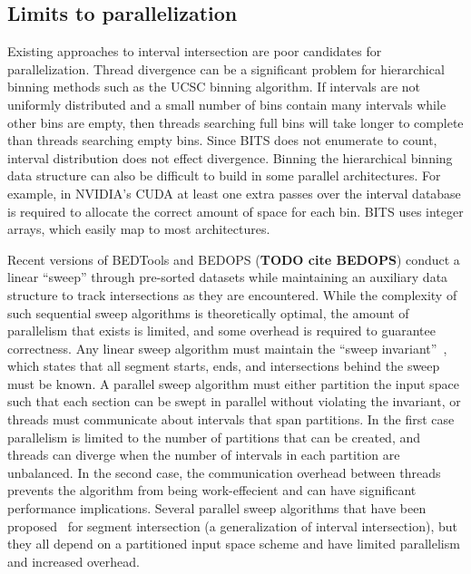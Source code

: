 \documentclass{bioinfo}
\begin{document}
	\subsection{Limits to parallelization}

	Existing approaches to interval intersection are poor candidates for
	parallelization.  Thread divergence can be a significant problem for
	hierarchical binning methods such as the UCSC binning algorithm.  If intervals
	are not uniformly distributed and a small number of bins contain many intervals
	while other bins are empty, then threads searching full bins will take longer to
	complete than threads searching empty bins.  Since BITS does not enumerate to
	count, interval distribution does not effect divergence.  Binning the 
	hierarchical binning data structure can also be difficult to build in some
	parallel architectures.  For example, in NVIDIA's CUDA at least one extra passes
	over the interval database is required to allocate the correct amount of space 
	for each bin.  BITS uses integer arrays, which easily map to most architectures.

	Recent versions of BEDTools and BEDOPS (\textbf{TODO cite BEDOPS}) conduct a
	linear ``sweep'' through pre-sorted datasets while maintaining an auxiliary
	data structure to track intersections as they are encountered. While the
	complexity of such sequential sweep algorithms is theoretically optimal, the 
	amount of parallelism that exists is limited, and some overhead is required to
	guarantee correctness.  Any linear sweep algorithm must maintain the ``sweep
	invariant''~\cite{mckenney2009}, which states that all segment starts, ends, 
	and intersections behind the sweep must be known.  A parallel sweep algorithm
	must either partition the input space such that each section can be swept in
	parallel without violating the invariant, or threads must communicate 
	about intervals that span partitions.  In the first case parallelism is limited
	to the number of partitions that can be created, and threads can diverge when 
	the number of intervals in each partition are unbalanced.  In the second case,
	the communication overhead between threads prevents the algorithm from being 
	work-effecient and can have significant performance implications.  Several
	parallel sweep algorithms that have been proposed~\citep{goodrich1993,
	kriegel1991, mckenney2009} for segment intersection (a generalization of
	interval intersection), but they all depend on a partitioned input space scheme
	and have limited parallelism and increased overhead.
\end{document}
